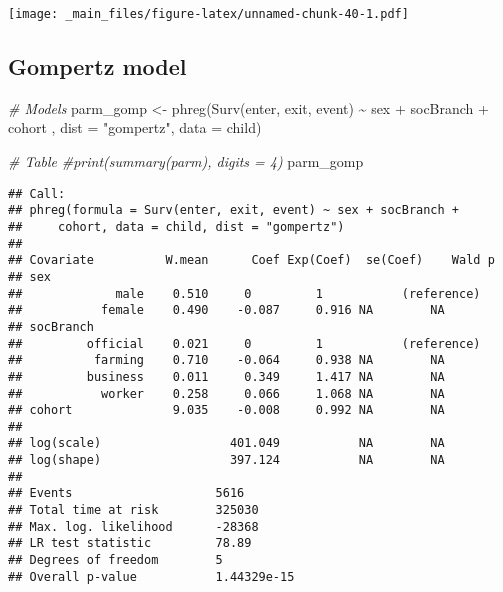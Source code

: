 \documentclass[
]{book}
\newenvironment{Shaded}{\begin{snugshade}}{\end{snugshade}}
\newcommand{\AttributeTok}[1]{\textcolor[rgb]{0.77,0.63,0.00}{#1}}
\newcommand{\CommentTok}[1]{\textcolor[rgb]{0.56,0.35,0.01}{\textit{#1}}}
\newcommand{\FunctionTok}[1]{\textcolor[rgb]{0.00,0.00,0.00}{#1}}
\newcommand{\NormalTok}[1]{#1}
\newcommand{\OtherTok}[1]{\textcolor[rgb]{0.56,0.35,0.01}{#1}}
\newcommand{\SpecialCharTok}[1]{\textcolor[rgb]{0.00,0.00,0.00}{#1}}
\newcommand{\StringTok}[1]{\textcolor[rgb]{0.31,0.60,0.02}{#1}}
\begin{document}
\texttt{[image: \_main\_files/figure-latex/unnamed-chunk-40-1.pdf]}

\hypertarget{gompertz-model}{%
\subsection{Gompertz model}\label{gompertz-model}}

\begin{Shaded}
\begin{Highlighting}[]
\CommentTok{\# Models}
\NormalTok{parm\_gomp }\OtherTok{\textless{}{-}} \FunctionTok{phreg}\NormalTok{(}\FunctionTok{Surv}\NormalTok{(enter, exit, event) }\SpecialCharTok{\textasciitilde{}}\NormalTok{ sex }\SpecialCharTok{+}\NormalTok{ socBranch }\SpecialCharTok{+}\NormalTok{ cohort , }
              \AttributeTok{dist =} \StringTok{"gompertz"}\NormalTok{,}
              \AttributeTok{data =}\NormalTok{ child)}

\CommentTok{\# Table}
\CommentTok{\#print(summary(parm), digits = 4)}
\NormalTok{parm\_gomp}
\end{Highlighting}
\end{Shaded}

\begin{verbatim}
## Call:
## phreg(formula = Surv(enter, exit, event) ~ sex + socBranch + 
##     cohort, data = child, dist = "gompertz")
## 
## Covariate          W.mean      Coef Exp(Coef)  se(Coef)    Wald p
## sex 
##             male    0.510     0         1           (reference)
##           female    0.490    -0.087     0.916 NA        NA        
## socBranch 
##         official    0.021     0         1           (reference)
##          farming    0.710    -0.064     0.938 NA        NA        
##         business    0.011     0.349     1.417 NA        NA        
##           worker    0.258     0.066     1.068 NA        NA        
## cohort              9.035    -0.008     0.992 NA        NA        
## 
## log(scale)                  401.049           NA        NA        
## log(shape)                  397.124           NA        NA        
## 
## Events                    5616 
## Total time at risk        325030 
## Max. log. likelihood      -28368 
## LR test statistic         78.89 
## Degrees of freedom        5 
## Overall p-value           1.44329e-15
\end{verbatim}
\end{document}
